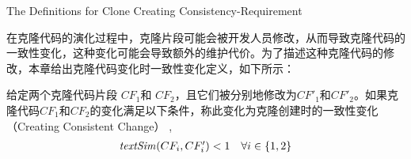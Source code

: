 




{The Definitions for Clone Creating Consistency-Requirement}

在克隆代码的演化过程中，克隆片段可能会被开发人员修改，从而导致克隆代码的一致性变化，这种变化可能会导致额外的维护代价。为了描述这种克隆代码的修改，本章给出克隆代码变化时一致性变化定义，如下所示：\\

\begin{definition}
\label{def-creatingchange}
给定两个克隆代码片段 $CF_1$和 $CF_2$，且它们被分别地修改为$CF'_1$和$CF'_2$。如果克隆代码$CF_1$和$CF_2$的变化满足以下条件，称此变化为{克隆创建时的一致性变化（Creating Consistent Change）} , 
  \[
  \begin{array}[t]{cr}
    \mathit{textSim}(CF_i, CF'_i) < 1 & \forall i \in \{1,2\}  \\
  \end{array}
  \]
\end{definition}

